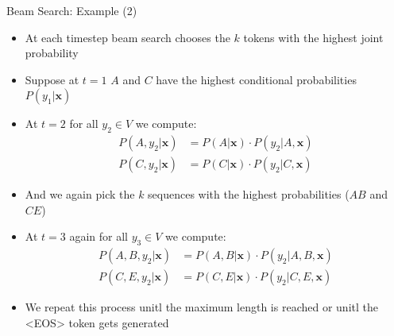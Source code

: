 \begin{vbframe}{Beam Search: Example (2)}

\vfill

\begin{itemize}
    \item At each timestep beam search chooses the $k$ tokens with the highest joint probability
    \item Suppose at $t=1$ $A$ and $C$ have the highest conditional probabilities $P(y_1|\mathbf{x})$
    \item At $t=2$ for all $y_2\in V$ we compute:
    $$
    \begin{aligned}
    P(A,y_2|\mathbf{x}) &= P(A|\mathbf{x})\cdot P(y_2|A,\mathbf{x}) \\
    P(C,y_2|\mathbf{x}) &= P(C|\mathbf{x})\cdot P(y_2|C,\mathbf{x})
    \end{aligned}
    $$
    \item And we again pick the $k$ sequences with the highest probabilities ($AB$ and $CE$)
    \item At $t=3$ again for all $y_3\in V$ we compute:
    $$
    \begin{aligned}
    P(A,B,y_2|\mathbf{x}) &= P(A,B|\mathbf{x})\cdot P(y_2|A,B,\mathbf{x}) \\
    P(C,E,y_2|\mathbf{x}) &= P(C,E|\mathbf{x})\cdot P(y_2|C,E,\mathbf{x})
    \end{aligned}
    $$
    \item We repeat this process unitl the maximum length is reached or unitl the <EOS> token gets generated
\end{itemize}

\vfill
    
\end{vbframe}






